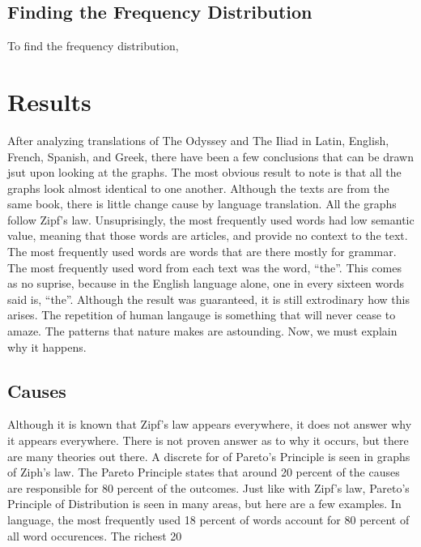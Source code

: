 \documentclass[a4paper,10pt]{article}
\begin{document}
\subsection{Finding the Frequency Distribution}

To find the frequency distribution, 

\section{Results}

After analyzing translations of The Odyssey and The Iliad in Latin, English, French, Spanish, and Greek, there have been a few conclusions that can be drawn jsut upon looking at the graphs. The most obvious result to note is that all the graphs look almost identical to one another. Although the texts are from the same book, there is little change cause by language translation. All the graphs follow Zipf's law. Unsuprisingly, the most frequently used words had low semantic value, meaning that those words are articles, and provide no context to the text. The most frequently used words are words that are there mostly for grammar. The most frequently used word from each text was the word, ``the''. This comes as no suprise, because in the English language alone, one in every sixteen words said is, ``the''. Although the result was guaranteed, it is still extrodinary how this arises. The repetition of human langauge is something that will never cease to amaze. The patterns that nature makes are astounding. Now, we must explain why it happens. 


\subsection{Causes}

Although it is known that Zipf's law appears everywhere, it does not answer why it appears everywhere. There is not proven answer as to why it occurs, but there are many theories out there. A discrete for of Pareto's Principle is seen in graphs of Ziph's law. The Pareto Principle states that around 20 percent of the causes are responsible for 80 percent of the outcomes. Just like with Zipf's law, Pareto's Principle of Distribution is seen in many areas, but here are a few examples. In language, the most frequently used 18 percent of words account for 80 percent of all word occurences. The richest 20%
\end{document}
